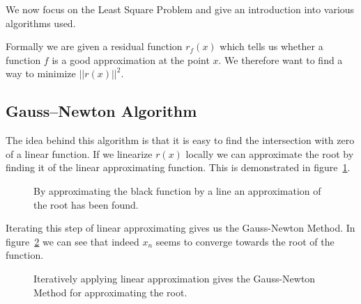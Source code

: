 
We now focus on the Least Square Problem and give an introduction into various algorithms used.

Formally we are given a residual function $r_f(x)$ which tells us whether a function $f$ is a good approximation at the point $x$. We therefore want to find a way to minimize $||r(x)||^2$.

\subsection{Gauss–Newton Algorithm}

The idea behind this algorithm is that it is easy to find the intersection with zero of a linear function. If we linearize $r(x)$ locally we can approximate the root by finding it of the linear approximating function. This is demonstrated in figure~\ref{fig:approx_root_with_lin}.

\begin{figure}[h]
	\centering
	\caption{By approximating the black function by a line an approximation of the root has been found.}
	\label{fig:approx_root_with_lin}
\end{figure}

Iterating this step of linear approximating gives us the Gauss-Newton Method. In figure~\ref{fig:gauss_newton_example} we can see that indeed $x_n$ seems to converge towards the root of the function.

\begin{figure}[h]
	\centering
	\caption{Iteratively applying linear approximation gives the Gauss-Newton Method for approximating the root.}
	\label{fig:gauss_newton_example}
\end{figure}

